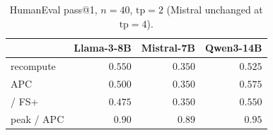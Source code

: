 \begin{table}[t]
\centering
\caption{HumanEval pass@1, $n{=}40$, $\mathrm{tp}{=}2$ (Mistral unchanged at $\mathrm{tp}{=}4$).}
\label{tab:multi-he}
\scriptsize
\begin{tabular}{lrrr}
\toprule
 & Llama-3-8B & Mistral-7B & Qwen3-14B \\
\midrule
recompute & $0.550$ & $0.350$ & $0.525$ \\
APC & $0.500$ & $0.350$ & $0.575$ \\
\sys{} / FS+ & $0.475$ & $0.350$ & $0.550$ \\
peak / APC & $0.90$ & $0.89$ & $0.95$ \\
\bottomrule
\end{tabular}
\end{table}
